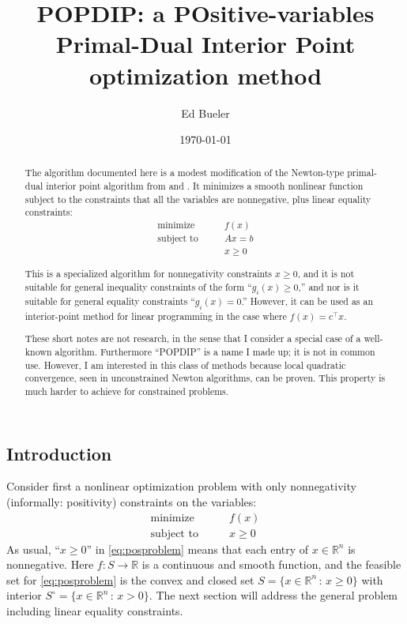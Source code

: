 \documentclass[11pt]{article}
\title{POPDIP: a POsitive-variables \\ Primal-Dual Interior Point optimization method}
\author{Ed Bueler}
\date{\today}
\newcommand{\RR}{\mathbb{R}}
\begin{document}
\maketitle

\begin{abstract}
The algorithm documented here is a modest modification of the Newton-type primal-dual interior point algorithm from \cite[Algorithm 16.1, section 16.7]{GrivaNashSofer2009} and \cite{YamashitaYabe1996}.  It minimizes a smooth nonlinear function subject to the constraints that all the variables are nonnegative, plus linear equality constraints:
\begin{equation}
\begin{matrix}
\text{minimize} \qquad   & f(x) \\
\text{subject to} \qquad & A x = b \\
                         & x \ge 0
\end{matrix} \label{eq:abstractproblem}
\end{equation}

This is a specialized algorithm for nonnegativity constraints $x\ge 0$, and it is not suitable for general inequality constraints of the form ``$g_i(x)\ge 0$,'' and nor is it suitable for general equality constraints ``$g_i(x)=0$.''  However, it can be used as an interior-point method for linear programming in the case where $f(x)=c^\top x$.

These short notes are not research, in the sense that I consider a special case of a well-known algorithm.  Furthermore ``POPDIP'' is a name I made up; it is not in common use.  However, I am interested in this class of methods because local quadratic convergence, seen in unconstrained Newton algorithms, can be proven.  This property is much harder to achieve for constrained problems.
\end{abstract}

\thispagestyle{empty}

\bigskip
\subsection*{Introduction}

Consider first a nonlinear optimization problem with only nonnegativity (informally: positivity) constraints on the variables:
\begin{equation}
\begin{matrix}
\text{minimize} \qquad & f(x) \\
\text{subject to} \qquad & x \ge 0
\end{matrix} \label{eq:posproblem}
\end{equation}
As usual, ``$x\ge 0$'' in \eqref{eq:posproblem} means that each entry of $x\in\RR^n$ is nonnegative.  Here $f:S \to \RR$ is a continuous and smooth function, and the feasible set for \eqref{eq:posproblem} is the convex and closed set $S = \{x\in \RR^n\,:\,x\ge 0\}$ with interior $S^\circ = \{x\in \RR^n\,:\,x > 0\}$.  The next section will address the general problem including linear equality constraints.
\end{document}
